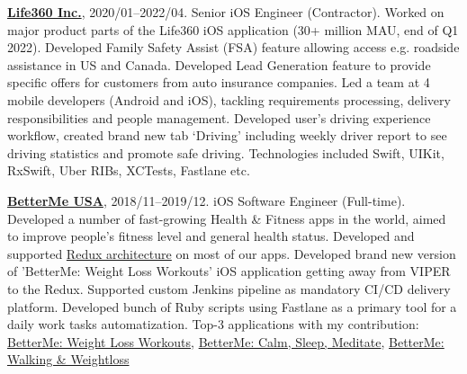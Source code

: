 \documentclass{nk-resume}
\begin{document}
\textbf{\href{https://www.life360.com}{Life360 Inc.}}, 2020/01--2022/04. 
Senior iOS Engineer (Contractor).
\newline Worked on major product parts of the Life360 iOS application 
(30+ million MAU, end of Q1 2022). Developed Family Safety Assist (FSA) feature allowing access 
e.g. roadside assistance in US and Canada. Developed Lead Generation feature to provide specific offers 
for customers from auto insurance companies. Led a team at 4 mobile developers (Android and iOS), 
tackling requirements processing, delivery responsibilities and people management. Developed user's 
driving experience workflow, created brand new tab ‘Driving’ including weekly driver report 
to see driving statistics and promote safe driving.\newline
Technologies included Swift, UIKit, RxSwift, Uber RIBs, XCTests, Fastlane etc.

\vspace*{14px}

\textbf{\href{https://betterme.world/about}{BetterMe USA}}, 2018/11--2019/12. 
iOS Software Engineer (Full-time).
\newline Developed a number of fast-growing Health \& Fitness apps in the world, 
aimed to improve people’s fitness level and general health status. Developed and supported 
\href{https://www.raywenderlich.com/books/advanced-ios-app-architecture/v3.0/chapters/6-architecture-redux}{Redux architecture} 
on most of our apps. Developed brand new version of 'BetterMe: Weight Loss Workouts' iOS application 
getting away from VIPER to the Redux. Supported custom Jenkins pipeline as mandatory CI/CD delivery platform. 
Developed bunch of Ruby scripts using Fastlane as a primary tool for a daily work tasks automatization.
\newline Top-3 applications with my contribution: 
\href{https://apps.apple.com/us/app/betterme-weight-loss-workouts/id1264546236}{BetterMe: Weight Loss Workouts}, 
\href{https://apps.apple.com/us/app/betterme-calm-sleep-meditate/id1363010081}{BetterMe: Calm, Sleep, Meditate}, 
\href{https://apps.apple.com/us/app/betterme-walking-weightloss/id1434400695}{BetterMe: Walking \& Weightloss}

\vspace*{14px}
\end{document}
